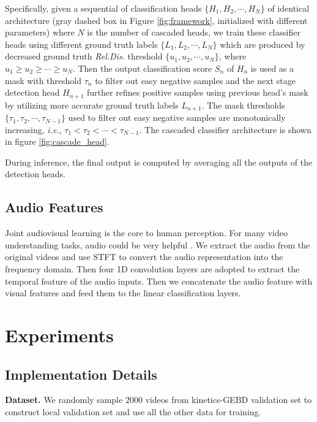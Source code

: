 \documentclass[final]{cvpr}
\begin{document}
Specifically, given a sequential of classification heads $\lbrace H_1,H_2,\cdots,H_N\rbrace$ of identical architecture (gray dashed box in Figure \ref{fig:framework}, initialized with different parameters) where $N$ is the number of cascaded heads, we train these classifier heads using different ground truth labels $\lbrace L_1,L_2,\cdots,L_N\rbrace$ which are produced by decreased ground truth \textit{Rel.Dis.} threshold $\lbrace u_1,u_2,\cdots,u_N\rbrace$, where $u_1 \geq u_2 \geq \cdots \geq u_N$. Then the output classification score $S_n$ of $H_n$ is used as a mask with threshold $\tau_{n}$ to filter out easy negative samples and the next stage detection head $H_{n+1}$ further refines positive samples using previous head's mask by utilizing more accurate ground truth labels $L_{n+1}$. The mask thresholds $\lbrace \tau_1,\tau_2,\cdots,\tau_{N-1}\rbrace$ used to filter out easy negative samples are monotonically increasing, \textit{i.e.}, $\tau_1 < \tau_2 < \cdots < \tau_{N-1}$. The cascaded classifier architecture is shown in figure \ref{fig:cascade_head}.

During inference, the final output is computed by averaging all the outputs of the detection heads.

\subsection{Audio Features}
Joint audiovisual learning is the core to human perception. For many video understanding tasks, audio could be very helpful \cite{avslowfast}. We extract the audio from the original videos and use STFT to convert the audio representation into the frequency domain. Then four 1D convolution layers are adopted to extract the temporal feature of the audio inputs. Then we concatenate the audio feature with visual features and feed them to the linear classification layers.

\section{Experiments}

\subsection{Implementation Details}
\textbf{Dataset.} We randomly sample $2000$ videos from kinetics-GEBD validation set to construct local validation set and use all the other data for training. 
\end{document}

